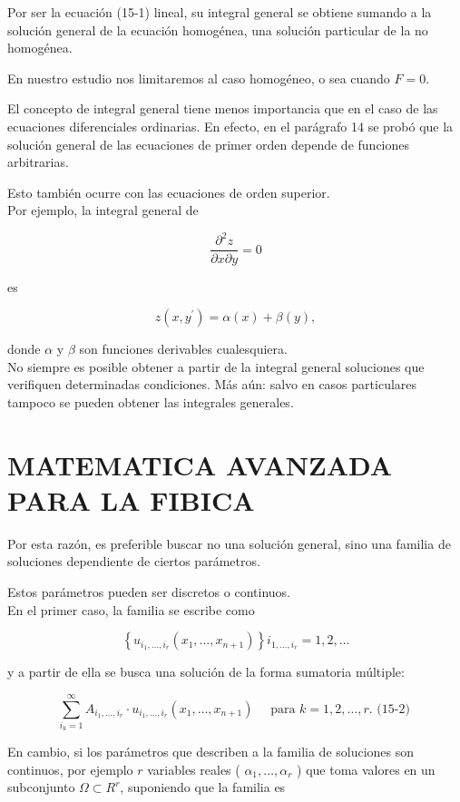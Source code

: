 \documentclass[10pt]{article}
\theoremstyle{plain}
\theoremstyle{definition}
\theoremstyle{remark}
\begin{document}
Por ser la ecuación (15-1) lineal, su integral general se obtiene sumando a la solución general de la ecuación homogénea, una solución particular de la no homogénea.

En nuestro estudio nos limitaremos al caso homogéneo, o sea cuando $F=0$.

El concepto de integral general tiene menos importancia que en el caso de las ecuaciones diferenciales ordinarias. En efecto, en el parágrafo 14 se probó que la solución general de las ecuaciones de primer orden depende de funciones arbitrarias.

Esto también ocurre con las ecuaciones de orden superior.\\
Por ejemplo, la integral general de

$$
\frac{\partial^{2} z}{\partial x \partial y}=0
$$

es

$$
z\left(x, y^{\prime}\right)=\alpha(x)+\beta(y),
$$

donde $\alpha$ y $\beta$ son funciones derivables cualesquiera.\\
No siempre es posible obtener a partir de la integral general soluciones que verifiquen determinadas condiciones. Más aún: salvo en casos particulares tampoco se pueden obtener las integrales generales.

\section*{MATEMATICA AVANZADA PARA LA FIBICA}
Por esta razón, es preferible buscar no una solución general, sino una familia de soluciones dependiente de ciertos parámetros.

Estos parámetros pueden ser discretos o continuos.\\
En el primer caso, la familia se escribe como

$$
\left\{u_{i_{1}, \ldots, i_{r}}\left(x_{1}, \ldots, x_{n+1}\right)\right\} i_{1, \ldots, i_{r}}=1,2, \ldots
$$

y a partir de ella se busca una solución de la forma sumatoria múltiple:

$$
\sum_{i_{k}=1}^{\infty} A_{i_{1}, \ldots, i_{r}} \cdot u_{i_{1}, \ldots, i_{r}}\left(x_{1}, \ldots, x_{n+1}\right) \quad \text { para } k=1,2, \ldots, r . \text { (15-2) }
$$

En cambio, si los parámetros que describen a la familia de soluciones son continuos, por ejemplo $r$ variables reales ( $\alpha_{1}, \ldots, \alpha_{r}$ ) que toma valores en un subconjunto $\Omega \subset R^{r}$, suponiendo que la familia es
\end{document}
